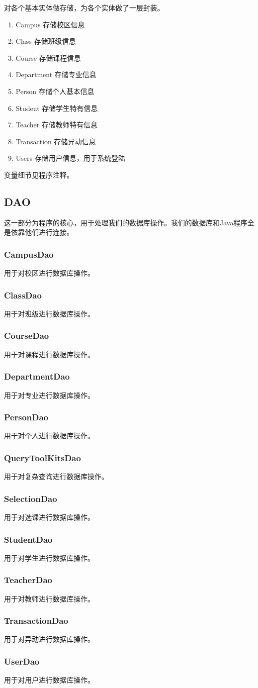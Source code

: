 \documentclass[../report.tex]{subfiles}
\begin{document}
对各个基本实体做存储，为各个实体做了一层封装。

\begin{enumerate}
\itemsep 0em
\item Campus 存储校区信息
\item Class 存储班级信息
\item Course 存储课程信息
\item Department 存储专业信息
\item Person 存储个人基本信息
\item Student 存储学生特有信息
\item Teacher 存储教师特有信息
\item Transaction 存储异动信息
\item Users 存储用户信息，用于系统登陆
\end{enumerate}

变量细节见程序注释。

\subsection{DAO}

这一部分为程序的核心，用于处理我们的数据库操作。我们的数据库和Java程序全是依靠他们进行连接。

\subsubsection{CampusDao}
用于对校区进行数据库操作。
\subsubsection{ClassDao}
用于对班级进行数据库操作。
\subsubsection{CourseDao}
用于对课程进行数据库操作。
\subsubsection{DepartmentDao}
用于对专业进行数据库操作。
\subsubsection{PersonDao}
用于对个人进行数据库操作。
\subsubsection{QueryToolKitsDao}
用于对复杂查询进行数据库操作。
\subsubsection{SelectionDao}
用于对选课进行数据库操作。
\subsubsection{StudentDao}
用于对学生进行数据库操作。
\subsubsection{TeacherDao}
用于对教师进行数据库操作。
\subsubsection{TransactionDao}
用于对异动进行数据库操作。
\subsubsection{UserDao}
用于对用户进行数据库操作。
\end{document}
